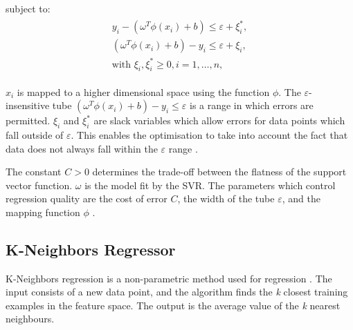 \noindent subject to:
\begin{align}
\begin{multlined}
\label{svr:constrains}
y_i-(\omega^T\phi(x_i)+b)\leq\varepsilon+\xi_i^{*},\\
(\omega^T\phi(x_i)+b)-y_i\leq\varepsilon+\xi_i,\\
\text{with }\xi_i,\xi^*_i\geq0,i=1,\ldots,n,
\end{multlined}
\end{align}

\noindent $x_i$ is mapped to a higher dimensional space using the function $\phi$. The $\varepsilon$-insensitive tube $(\omega^T\phi(x_i)+b)-y_i\leq\varepsilon$ is a range in which errors are permitted. $\xi_i$ and $\xi^*_i$ are slack variables which allow errors for data points which fall outside of $\varepsilon$. This enables the optimisation to take into account the fact that data does not always fall within the $\varepsilon$ range \cite{Smola2004}.

The constant $C>0$ determines the trade-off between the flatness of the support vector function. $\omega$ is the model fit by the SVR. The parameters which control regression quality are the cost of error $C$, the width of the tube $\varepsilon$, and the mapping function $\phi$ \cite{Chen2004, Shu2006}. 


\subsection{K-Neighbors Regressor}

K-Neighbors regression is a non-parametric method used for regression \cite{forgy65}. The input consists of a new data point, and the algorithm finds the \textit{k} closest training examples in the feature space. The output is the average value of the \textit{k} nearest neighbours.









